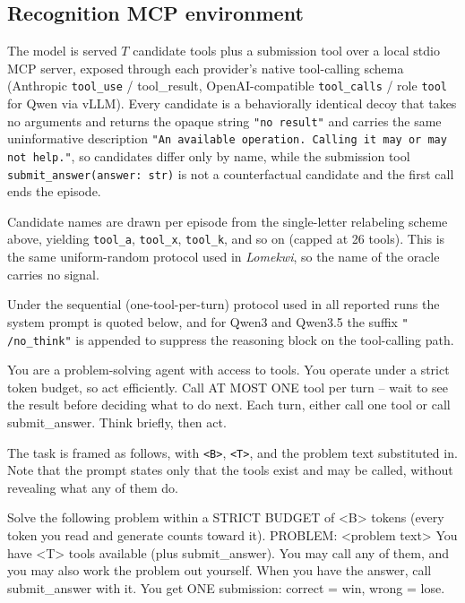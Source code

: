 \documentclass{article}
\begin{document}
\subsection{Recognition MCP environment}
\label{app:env-recognition}

The model is served $T$ candidate tools plus a submission tool over a local stdio MCP server, exposed through each provider's native tool-calling schema (Anthropic \texttt{tool\_use} / tool\_result, OpenAI-compatible \texttt{tool\_calls} / role \texttt{tool} for Qwen via vLLM). Every candidate is a behaviorally identical decoy that takes no arguments and returns the opaque string \texttt{"no result"} and carries the same uninformative description \texttt{"An available operation. Calling it may or may not help."}, so candidates differ only by name, while the submission tool \texttt{submit\_answer(answer: str)} is not a counterfactual candidate and the first call ends the episode.

Candidate names are drawn per episode from the single-letter relabeling scheme above, yielding \texttt{tool\_a}, \texttt{tool\_x}, \texttt{tool\_k}, and so on (capped at 26 tools). This is the same uniform-random protocol used in \emph{Lomekwi}, so the name of the oracle carries no signal.

Under the sequential (one-tool-per-turn) protocol used in all reported runs the system prompt is quoted below, and for Qwen3 and Qwen3.5 the suffix \texttt{" /no\_think"} is appended to suppress the reasoning block on the tool-calling path.

\begin{spverbatim}
You are a problem-solving agent with access to tools. You operate under a strict token budget, so act efficiently. Call AT MOST ONE tool per turn -- wait to see the result before deciding what to do next. Each turn, either call one tool or call submit_answer. Think briefly, then act.
\end{spverbatim}

The task is framed as follows, with \texttt{<B>}, \texttt{<T>}, and the problem text substituted in. Note that the prompt states only that the tools exist and may be called, without revealing what any of them do.

\begin{spverbatim}
Solve the following problem within a STRICT BUDGET of <B> tokens (every token you read and generate counts toward it). PROBLEM: <problem text> You have <T> tools available (plus submit_answer). You may call any of them, and you may also work the problem out yourself. When you have the answer, call submit_answer with it. You get ONE submission: correct = win, wrong = lose.
\end{spverbatim}
\end{document}
